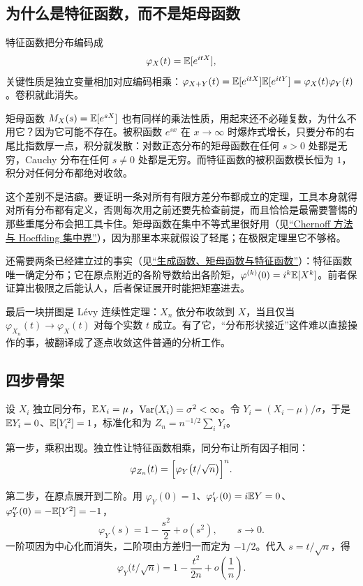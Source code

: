 \subsection{为什么是特征函数，而不是矩母函数}

特征函数把分布编码成
\[
\varphi_X(t)=\mathbb{E}[e^{itX}],
\]
关键性质是独立变量相加对应编码相乘：\(\varphi_{X+Y}(t)=\mathbb{E}[e^{itX}]\mathbb{E}[e^{itY}]=\varphi_X(t)\varphi_Y(t)\)。卷积就此消失。

矩母函数 \(M_X(s)=\mathbb{E}[e^{sX}]\) 也有同样的乘法性质，用起来还不必碰复数，为什么不用它？因为它可能不存在。被积函数 \(e^{sx}\) 在 \(x\to\infty\) 时爆炸式增长，只要分布的右尾比指数厚一点，积分就发散：对数正态分布的矩母函数在任何 \(s>0\) 处都是无穷，Cauchy 分布在任何 \(s\neq0\) 处都是无穷。而特征函数的被积函数模长恒为 \(1\)，积分对任何分布都绝对收敛。

这个差别不是洁癖。要证明一条对所有有限方差分布都成立的定理，工具本身就得对所有分布都有定义，否则每次用之前还要先检查前提，而且恰恰是最需要警惕的那些重尾分布会把工具卡住。矩母函数在集中不等式里很好用（见\hyperref[sec:05-Probability/07-Transforms-and-Bounds/04]{``Chernoff 方法与 Hoeffding 集中界''}），因为那里本来就假设了轻尾；在极限定理里它不够格。

还需要两条已经建立过的事实（见\hyperref[sec:05-Probability/07-Transforms-and-Bounds/01]{``生成函数、矩母函数与特征函数''}）：特征函数唯一确定分布；它在原点附近的各阶导数给出各阶矩，\(\varphi^{(k)}(0)=i^k\mathbb{E}[X^k]\)。前者保证算出极限之后能认人，后者保证展开时能把矩塞进去。

最后一块拼图是 Lévy 连续性定理：\(X_n\) 依分布收敛到 \(X\)，当且仅当 \(\varphi_{X_n}(t)\to\varphi_X(t)\) 对每个实数 \(t\) 成立。有了它，``分布形状接近''这件难以直接操作的事，被翻译成了逐点收敛这件普通的分析工作。

\subsection{四步骨架}

设 \(X_i\) 独立同分布，\(\mathbb{E} X_i=\mu\)，\(\operatorname{Var}(X_i)=\sigma^2<\infty\)。令 \(Y_i=(X_i-\mu)/\sigma\)，于是 \(\mathbb{E} Y_i=0\)、\(\mathbb{E}[Y_i^2]=1\)，标准化和为 \(Z_n=n^{-1/2}\sum_i Y_i\)。

第一步，乘积出现。独立性让特征函数相乘，同分布让所有因子相同：
\[
\varphi_{Z_n}(t)=\Bigl[\varphi_Y\bigl(t/\sqrt n\bigr)\Bigr]^n .
\]

第二步，在原点展开到二阶。用 \(\varphi_Y(0)=1\)、\(\varphi_Y'(0)=i\mathbb{E} Y=0\)、\(\varphi_Y''(0)=-\mathbb{E}[Y^2]=-1\)，
\[
\varphi_Y(s)=1-\frac{s^2}2+o(s^2),\qquad s\to0 .
\]
一阶项因为中心化而消失，二阶项由方差归一而定为 \(-1/2\)。代入 \(s=t/\sqrt n\)，得
\[
\varphi_Y\bigl(t/\sqrt n\bigr)=1-\frac{t^2}{2n}+o\!\left(\frac1n\right).
\]

